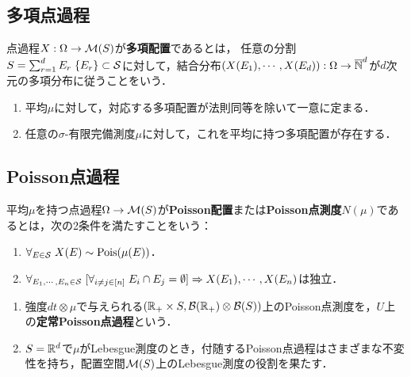 \documentclass[uplatex,dvipdfmx]{jsreport}
\begin{document}
\subsection{多項点過程}

\begin{definition}
    点過程$X:\Om\to\M(S)$が\textbf{多項配置}であるとは，
    任意の分割$S=\sum_{r=1}^dE_r\;\{E_r\}\subset\S$に対して，結合分布$(X(E_1),\cdots,X(E_d)):\Om\to\o{\N}^d$が$d$次元の多項分布に従うことをいう．
\end{definition}

\begin{lemma}\mbox{}
    \begin{enumerate}
        \item 平均$\mu$に対して，対応する多項配置が法則同等を除いて一意に定まる．
        \item 任意の$\sigma$-有限完備測度$\mu$に対して，これを平均に持つ多項配置が存在する．
    \end{enumerate}
\end{lemma}

\subsection{Poisson点過程}

\begin{definition}
    平均$\mu$を持つ点過程$\Om\to\M(S)$が\textbf{Poisson配置}または\textbf{Poisson点測度}$N(\mu)$であるとは，次の2条件を満たすことをいう：
    \begin{enumerate}
        \item $\forall_{E\in\S}\;X(E)\sim\Pois(\mu(E))$．
        \item $\forall_{E_1,\cdots,E_n\in\S}\;[\forall_{i\ne j\in[n]}\;E_i\cap E_j=\emptyset]\Rightarrow X(E_1),\cdots,X(E_n)$は独立．
    \end{enumerate}
\end{definition}
\begin{example}\mbox{}
    \begin{enumerate}
        \item 強度$dt\otimes \mu$で与えられる$(\R_+\times S,\B(\R_+)\otimes\B(S))$上のPoisson点測度を，$U$上の\textbf{定常Poisson点過程}という．
        \item $S=\R^d$で$\mu$がLebesgue測度のとき，付随するPoisson点過程はさまざまな不変性を持ち，配置空間$\M(S)$上のLebesgue測度の役割を果たす．
    \end{enumerate}
\end{example}
\end{document}

